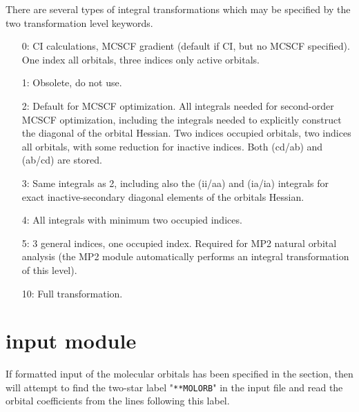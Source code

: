 There are several types of integral transformations which may be
specified by the two transformation level keywords.
\begin{itemize}
   \item[0:] CI calculations, MCSCF gradient (default if CI, but
             no MCSCF specified).
             One index all orbitals, three indices only active
             orbitals.

   \item[1:] Obsolete, do not use.

   \item[2:] Default for MCSCF optimization. All integrals needed for {\sir}
             second-order MCSCF optimization, including the integrals
             needed to explicitly construct the diagonal of the orbital
             Hessian. Two indices occupied orbitals, two indices all
             orbitals, with some reduction for inactive indices.
             Both (cd/ab) and (ab/cd) are stored.

   \item[3:] Same integrals as 2, including also the (ii/aa) and
             (ia/ia) integrals for exact inactive-secondary diagonal elements
             of the orbitals Hessian.

   \item[4:] All integrals with minimum two occupied indices.

   \item[5:] 3 general indices, one occupied index.  Required for MP2
             natural orbital analysis (the MP2 module automatically
             performs an integral transformation of this level).

  \item[10:] Full transformation.
\end{itemize}


\pagebreak[3]
\section{\label{sec:ref-molorbinp}  input module}

If formatted input of the molecular orbitals has been specified in
the  section, then {\sir} will attempt to find
the two-star label "\verb|**MOLORB|" in the input file and read
the orbital coefficients from the lines following this label.
